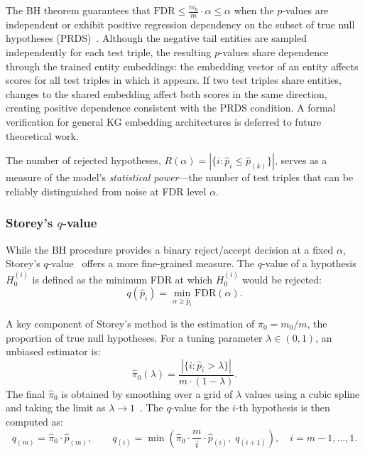 The BH theorem guarantees that $\text{FDR} \leq \frac{m_0}{m} \cdot \alpha \leq \alpha$ when the $p$-values are independent or exhibit positive regression dependency on the subset of true null hypotheses (PRDS)~\cite{benjamini2001control}.
Although the negative tail entities are sampled independently for each test triple, the resulting $p$-values share dependence through the trained entity embeddings: the embedding vector of an entity affects scores for all test triples in which it appears.
If two test triples share entities, changes to the shared embedding affect both scores in the same direction, creating positive dependence consistent with the PRDS condition.
A formal verification for general KG embedding architectures is deferred to future theoretical work.

The number of rejected hypotheses, $R(\alpha) = |\{i: \hat{p}_i \leq \hat{p}_{(k)}\}|$, serves as a measure of the model's \emph{statistical power}---the number of test triples that can be reliably distinguished from noise at FDR level $\alpha$.

\subsubsection{Storey's $q$-value}
\label{subsec:qvalue}

While the BH procedure provides a binary reject/accept decision at a fixed $\alpha$, Storey's $q$-value~\cite{storey2002direct, storey2003statistical} offers a more fine-grained measure.
The $q$-value of a hypothesis $H_0^{(i)}$ is defined as the minimum FDR at which $H_0^{(i)}$ would be rejected:
\begin{equation}
    q(\hat{p}_i) = \min_{\alpha \geq \hat{p}_i} \text{FDR}(\alpha).
\end{equation}

A key component of Storey's method is the estimation of $\pi_0 = m_0 / m$, the proportion of true null hypotheses.
For a tuning parameter $\lambda \in (0, 1)$, an unbiased estimator is:
\begin{equation}
    \hat{\pi}_0(\lambda) = \frac{|\{i : \hat{p}_i > \lambda\}|}{m \cdot (1 - \lambda)}.
    \label{eq:pi0}
\end{equation}
The final $\hat{\pi}_0$ is obtained by smoothing over a grid of $\lambda$ values using a cubic spline and taking the limit as $\lambda \to 1$~\cite{storey2002direct}.
The $q$-value for the $i$-th hypothesis is then computed as:
\begin{equation}
    q_{(m)} = \hat{\pi}_0 \cdot \hat{p}_{(m)}, \qquad
    q_{(i)} = \min\left(\hat{\pi}_0 \cdot \frac{m}{i} \cdot \hat{p}_{(i)}, \; q_{(i+1)}\right), \quad i = m-1, \dots, 1.
\end{equation}

